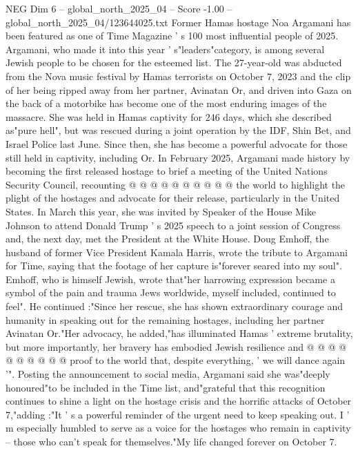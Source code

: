 \begin{textsample}{NEG Dim 6 – global\_north\_2025\_04 – Score -1.00 – global\_north\_2025\_04/123644025.txt}  \label{ex:f6_neg_262}
Former Hamas hostage Noa Argamani has been featured as one of Time Magazine ' s 100 most influential people of 2025.
Argamani, who made it into this year ' s"leaders"category, is among several Jewish people to be chosen for the esteemed list.
The 27-year-old was abducted from the Nova music festival by Hamas terrorists on October 7, 2023 and the clip of her being ripped away from her partner, Avinatan Or, and driven into Gaza on the back of a motorbike has become one of the most enduring images of the massacre.
She was held in Hamas captivity for 246 days, which she described as"pure hell", but was rescued during a joint operation by the IDF, Shin Bet, and Israel Police last June.
Since then, she has become a powerful advocate for those still held in captivity, including Or.
In February 2025, Argamani made history by becoming the first released hostage to brief a meeting of the United Nations Security Council, recounting @ @ @ @ @ @ @ @ @ @ the world to highlight the plight of the hostages and advocate for their release, particularly in the United States.
In March this year, she was invited by Speaker of the House Mike Johnson to attend Donald Trump ' s 2025 speech to a joint session of Congress and, the next day, met the President at the White House.
Doug Emhoff, the husband of former Vice President Kamala Harris, wrote the tribute to Argamani for Time, saying that the footage of her capture is"forever seared into my soul".
Emhoff, who is himself Jewish, wrote that"her harrowing expression became a symbol of the pain and trauma Jews worldwide, myself included, continued to feel".
He continued :"Since her rescue, she has shown extraordinary courage and humanity in speaking out for the remaining hostages, including her partner Avinatan Or."Her advocacy, he added,"has illuminated Hamas ' extreme brutality, but more importantly, her bravery has embodied Jewish resilience and @ @ @ @ @ @ @ @ @ @ proof to the world that, despite everything, ' we will dance again '".
Posting the announcement to social media, Argamani said she was"deeply honoured"to be included in the Time list, and"grateful that this recognition continues to shine a light on the hostage crisis and the horrific attacks of October 7,"adding :"It ' s a powerful reminder of the urgent need to keep speaking out.
I ' m especially humbled to serve as a voice for the hostages who remain in captivity -- those who can't speak for themselves."My life changed forever on October 7.

\end{textsample}
